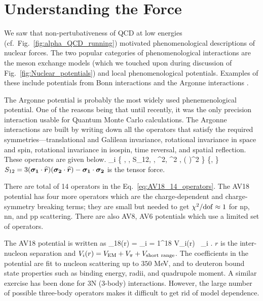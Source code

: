 	\section{Understanding the Force}
	\label{sec:recent_advances}

	We saw that non-pertubativeness of QCD at low energies
	(cf.~Fig.~\ref{fig:alpha_QCD_running}) motivated phenomenological
	descriptions of nuclear forces.  The two popular categories of
	phenomenological interactions are the meson exchange models (which we
	touched upon during discussion of Fig.~\ref{fig:Nuclear_potentials}) and
	local phenomenological potentials.  Examples of these include potentials
	from Bonn interactions \cite{Machleidt:1989tm, Machleidt:1987hj,
	Machleidt:2000ge} and the Argonne interactions \cite{Wiringa:1994wb}.

	The Argonne potential is probably the most widely used phenemenological
	potential.  One of the reasons being that until recently, it was the only
	precision interaction usable for Quantum Monte Carlo calculations.  The
	Argonne interactions are built by writing down all the operators that
	satisfy the required symmetries---translational and Galilean invariance,
	rotational invariance in space and spin, rotational invariance in isospin,
	time reversal, and spatial reflection.  These operators are given below.
	\beq
	_i \in \{ ,  \cdot {},
	S_{12},  \cdot {}, ^2, ^2  \cdot
	, ( \cdot {})^2 \} \otimes
	\{,  \cdot {}\}
	\label{eq:AV18_14_operators}
	\eeq
	$S_{12} = 3 (\bm{\sigma_1} \cdot \widehat{\bm{r}})
	(\bm{\sigma_2} \cdot \widehat{\bm{r}}) - \bm{\sigma_1} \cdot \bm{\sigma_2}$
	is the tensor force.

	There are total of 14 operators in the Eq.~\eqref{eq:AV18_14_operators}.
	The AV18 potential has four more operators which are the charge-dependent
	and charge-symmetry breaking terms; they are small but needed to get
	$\chi^2/{\rm{dof}} \approx 1$ for np, nn, and pp scattering.  There are
	also AV8, AV6 potentials which use a limited set of operators.

	The AV18 potential is written as
	\beq
	_{18}(r) = \sum_{i = 1}^{18} V_i(r) \, _i \;.
	\eeq
	$r$ is the inter-nucleon separation and $V_i (r) = V_{{\rm{EM}}} + V_{\pi}
	+ V_{{\rm{short~range}}}$.  The coefficients in the potential are fit to
	nucleon scattering up to $350$ MeV, and to deuteron bound state properties
	such as binding energy, radii, and quadrupole moment.
	A similar exercise has been done for 3N (3-body) interactions.  However,
	the large number of possible three-body operators makes it difficult to
	get rid of model dependence.

